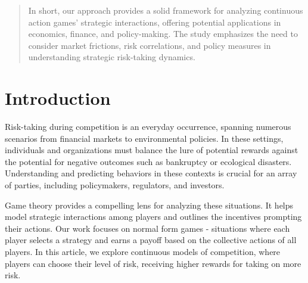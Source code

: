 \documentclass[preprint,12pt,authoryear]{elsarticle}
\theoremstyle{definition}
\begin{document}
\begin{frontmatter}
\begin{abstract}
In short, our approach provides a solid framework for analyzing continuous action games' strategic interactions, offering potential applications in economics, finance, and policy-making. The study emphasizes the need to consider market frictions, risk correlations, and policy measures in understanding strategic risk-taking dynamics.


\end{abstract}




\end{frontmatter}

\section{Introduction}
\label{sec:introduction}

Risk-taking during competition is an everyday occurrence, spanning numerous scenarios from financial markets to environmental policies. In these settings, individuals and organizations must balance the lure of potential rewards against the potential for negative outcomes such as bankruptcy or ecological disasters. Understanding and predicting behaviors in these contexts is crucial for an array of parties, including policymakers, regulators, and investors.

Game theory provides a compelling lens for analyzing these situations. It helps model strategic interactions among players and outlines the incentives prompting their actions. Our work focuses on normal form games - situations where each player selects a strategy and earns a payoff based on the collective actions of all players. In this article, we explore continuous models of competition, where players can choose their level of risk, receiving higher rewards for taking on more risk.
\end{document}
